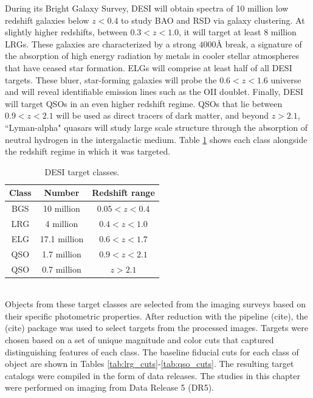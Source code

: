 During its Bright Galaxy Survey, DESI will obtain spectra of 10 million low redshift galaxies below $z<0.4$ to study BAO and RSD via galaxy clustering. At slightly higher redshifts, between $0.3<z<1.0$, it will target at least 8 million LRGs. These galaxies are characterized by a strong $4000\mbox{\AA}$ break, a signature of the absorption of high energy radiation by metals in cooler stellar atmospheres that have ceased star formation. ELGs will comprise at least half of all DESI targets. These bluer, star-forming galaxies will probe the $0.6<z<1.6$ universe and will reveal identifiable emission lines such as the OII doublet. 
Finally, DESI will target QSOs in an even higher redshift regime. QSOs that lie between $0.9<z<2.1$ will be used as direct tracers of dark matter, and beyond $z>2.1$, ``Lyman-alpha" quasars will study large scale structure through the absorption of neutral hydrogen in the intergalactic medium. Table \ref{tab:targets} shows each class alongside the redshift regime in which it was targeted.

\begin{table}
\caption{DESI target classes.}
\label{tab:targets}
\centering
\begin{tabular}{|c|c|c|}
  \hline
  Class & Number & Redshift range\\
  \hline \hline
  BGS & 10 million & $0.05<z<0.4$ \\
  \hline
  LRG & 4 million & $0.4<z<1.0$ \\
  \hline
  ELG & 17.1 million & $0.6<z<1.7$ \\
  \hline
  QSO & 1.7 million & $0.9<z<2.1$ \\
  \hline
  QSO & 0.7 million & $z>2.1$\\
  \hline
\end{tabular}
\end{table}\\

Objects from these target classes are selected from the imaging surveys based on their specific photometric properties. After reduction with the  pipeline (cite), the  (cite) package was used to select targets from the processed images. Targets were chosen based on a set of unique magnitude and color cuts that captured distinguishing features of each class. The baseline fiducial cuts for each class of object are shown in Tables \ref{tab:lrg_cuts}-\ref{tab:qso_cuts}. The resulting target catalogs were compiled in the form of data releases. The studies in this chapter were performed on imaging from Data Release 5 (DR5).


